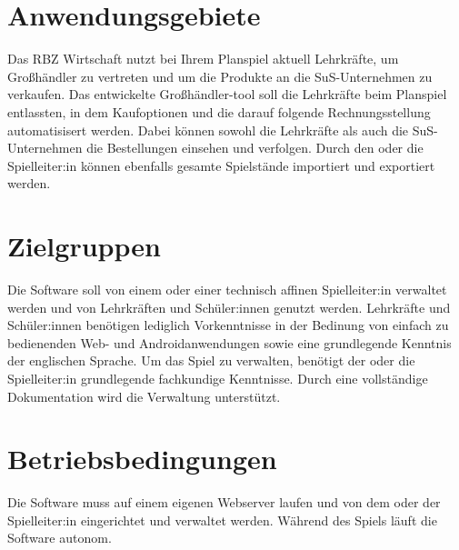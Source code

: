 \section*{Anwendungsgebiete}
Das RBZ Wirtschaft nutzt bei Ihrem Planspiel aktuell Lehrkräfte, um Großhändler zu vertreten und um die Produkte an die SuS-Unternehmen zu verkaufen. Das entwickelte Großhändler-tool soll die Lehrkräfte beim Planspiel entlassten, in dem Kaufoptionen und die darauf folgende Rechnungsstellung automatisisert werden. Dabei können sowohl die Lehrkräfte als auch die SuS-Unternehmen die Bestellungen einsehen und verfolgen. Durch den oder die Spielleiter:in können ebenfalls gesamte Spielstände importiert und exportiert werden.
\section*{Zielgruppen}
Die Software soll von einem oder einer technisch affinen Spielleiter:in verwaltet werden und von Lehrkräften und Schüler:innen genutzt werden. Lehrkräfte und Schüler:innen benötigen lediglich Vorkenntnisse in der Bedinung von einfach zu bedienenden Web- und Androidanwendungen sowie eine grundlegende Kenntnis der englischen Sprache. Um das Spiel zu verwalten, benötigt der oder die Spielleiter:in grundlegende fachkundige Kenntnisse. Durch eine vollständige Dokumentation wird die Verwaltung unterstützt.
\section*{Betriebsbedingungen}
Die Software muss auf einem eigenen Webserver laufen und von dem oder der Spielleiter:in eingerichtet und verwaltet werden.  Während des Spiels läuft die Software autonom.
